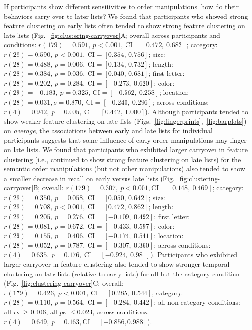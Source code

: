 \documentclass[11pt]{article}
\begin{document}
If participants show different sensitivities to order manipulations, how do
their behaviors carry over to later lists? We found that participants who
showed strong feature clustering on early lists often tended to show strong
feature clustering on late lists (Fig.~\ref{fig:clustering-carryover}A; overall
across participants and conditions: $r(179) = 0.591,~p < 0.001,~\mathrm{CI} =
[0.472,~0.682]$; category: $r(28) = 0.590,~p < 0.001,~\mathrm{CI} = [0.354,~
0.756]$; size: $r(28) = 0.488,~p = 0.006,~\mathrm{CI} = [0.134,~0.732]$;
length: $r(28) = 0.384,~p = 0.036,~\mathrm{CI} = [0.040,~0.681]$; first letter:
$r(28) = 0.202,~p = 0.284,~\mathrm{CI} = [-0.273,~0.620]$; color: $r(29) =
-0.183,~p = 0.325,~\mathrm{CI} = [-0.562,~0.258]$; location: $r(28) = 0.031, p
= 0.870,~\mathrm{CI} = [-0.240,~0.296]$; across conditions: $r(4) = 0.942,~p =
0.005,~\mathrm{CI} = [0.442,~1.000]$). Although participants tended to show
weaker feature clustering on late lists
(Figs.~\ref{fig:fingerprints},~\ref{fig:barplots}) on \textit{average}, the
associations between early and late lists for individual participants suggests
that some influence of early order manipulations may linger on late lists. We
found that participants who exhibited larger carryover in feature clustering
(i.e., continued to show strong feature clustering on late lists) for the
semantic order manipulations (but not other manipulations) also tended to show
a smaller decrease in recall on early versus late lists
(Fig.~\ref{fig:clustering-carryover}B; overall: $r(179) = 0.307,~p < 0.001,
\mathrm{CI} = [0.148,~0.469]$; category: $r(28) = 0.350,~p = 0.058,~\mathrm{CI}
= [0.050,~0.642]$; size: $r(28) = 0.708,~p < 0.001,~\mathrm{CI} = [0.472,~
0.862]$; length: $r(28) = 0.205,~p = 0.276,~\mathrm{CI} = [-0.109,~0.492]$;
first letter: $r(28) = 0.081,~p = 0.672,~\mathrm{CI} = [-0.433,~0.597]$; color:
$r(29) = 0.155,~p = 0.406,~\mathrm{CI} = [-0.174,~0.541]$; location: $r(28) =
0.052,~p = 0.787,~\mathrm{CI} = [-0.307,~0.360]$; across conditions: $r(4) =
0.635,~p = 0.176,~\mathrm{CI} = [-0.924,~0.981]$). Participants who exhibited
larger carryover in feature clustering also tended to show stronger temporal
clustering on late lists (relative to early lists) for all but the category
condition (Fig.~\ref{fig:clustering-carryover}C; overall: $r(179) = 0.426,~p <
0.001,~\mathrm{CI} = [0.285,~0.544]$; category: $r(28) = 0.110,~p = 0.564,~
\mathrm{CI} = [-0.284,~0.442]$; all non-category conditions: all $r$s $\geq
0.406$, all $p$s $\leq 0.023$; across conditions: $r(4) = 0.649,~p = 0.163,
\mathrm{CI} = [-0.856, 0.988]$).
\end{document}
